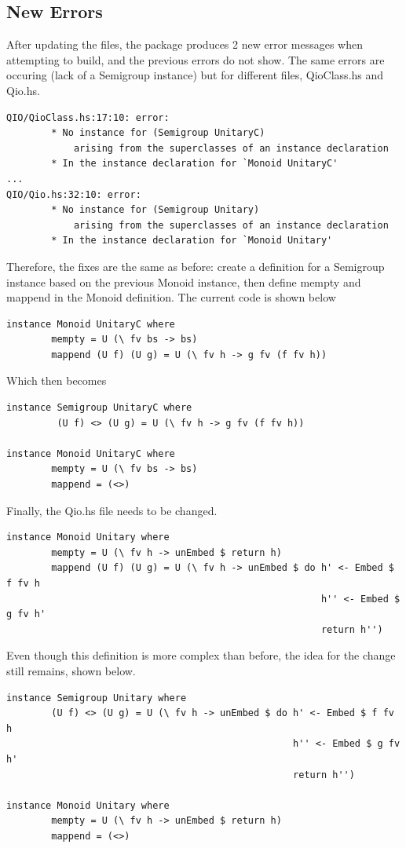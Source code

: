 \documentclass[a4paper,11pt, titlepage, twoside]{article}
\begin{document}
\subsection{New Errors}
After updating the files, the package produces 2 new error messages when attempting to build, and the previous errors do not show. The same errors are occuring (lack of a Semigroup instance) but for different files, QioClass.hs and Qio.hs.
\begin{verbatim}
QIO/QioClass.hs:17:10: error:
        * No instance for (Semigroup UnitaryC)
            arising from the superclasses of an instance declaration
        * In the instance declaration for `Monoid UnitaryC'
...
QIO/Qio.hs:32:10: error:
        * No instance for (Semigroup Unitary)
            arising from the superclasses of an instance declaration
        * In the instance declaration for `Monoid Unitary'
\end{verbatim}
Therefore, the fixes are the same as before: create a definition for a Semigroup instance based on the previous Monoid instance, then define mempty and mappend in the Monoid definition. The current code is shown below
\begin{verbatim}
instance Monoid UnitaryC where
        mempty = U (\ fv bs -> bs)
        mappend (U f) (U g) = U (\ fv h -> g fv (f fv h))
\end{verbatim}
Which then becomes
\begin{verbatim}
instance Semigroup UnitaryC where
         (U f) <> (U g) = U (\ fv h -> g fv (f fv h))
        
instance Monoid UnitaryC where
        mempty = U (\ fv bs -> bs)
        mappend = (<>)
\end{verbatim}
Finally, the Qio.hs file needs to be changed.
\begin{verbatim}
instance Monoid Unitary where
        mempty = U (\ fv h -> unEmbed $ return h)
        mappend (U f) (U g) = U (\ fv h -> unEmbed $ do h' <- Embed $ f fv h
                                                        h'' <- Embed $ g fv h'
                                                        return h'')
\end{verbatim}
Even though this definition is more complex than before, the idea for the change still remains, shown below.
\begin{verbatim}
instance Semigroup Unitary where
        (U f) <> (U g) = U (\ fv h -> unEmbed $ do h' <- Embed $ f fv h
                                                   h'' <- Embed $ g fv h'
                                                   return h'')
                                                
instance Monoid Unitary where
        mempty = U (\ fv h -> unEmbed $ return h)
        mappend = (<>)
\end{verbatim}
\end{document}
